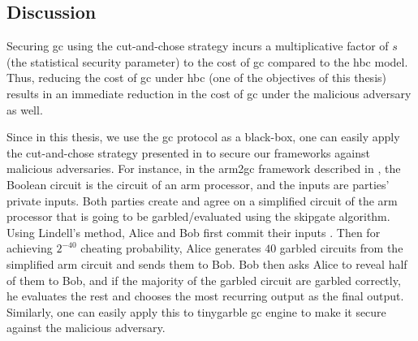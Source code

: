 \subsection{Discussion}\label{sec:related-malicious-dis}
Securing \acrshort{gc} using the cut-and-chose strategy incurs a multiplicative factor of $s$ (the statistical security parameter) to the cost of \acrshort{gc} compared to the \acrshort{hbc} model.
Thus, reducing the cost of \acrshort{gc} under \acrshort{hbc} (one of the objectives of this thesis) results in an immediate reduction in the cost of \acrshort{gc} under the malicious adversary as well.

Since in this thesis, we use the \acrshort{gc} protocol as a black-box, one can easily apply the cut-and-chose strategy presented in \cite{lindell2016fast} to secure our frameworks against malicious adversaries.
For instance, in the \gls{arm2gc} framework described in , the Boolean circuit is the circuit of an \gls{arm} processor, and the inputs are parties' private inputs.
Both parties create and agree on a simplified circuit of the \gls{arm} processor that is going to be garbled/evaluated using the \gls{skipgate} algorithm.
Using Lindell's method, Alice and Bob first commit their inputs \cite{lindell2016fast}.
Then for achieving $2^{-40}$ cheating probability, Alice generates $40$ garbled circuits from the simplified \gls{arm} circuit and sends them to Bob.
Bob then asks Alice to reveal half of them to Bob, and if the majority of the garbled circuit are garbled correctly, he evaluates the rest and chooses the most recurring output as the final output.
Similarly, one can easily apply this to \gls{tinygarble} \acrshort{gc} engine to make it secure against the malicious adversary.
